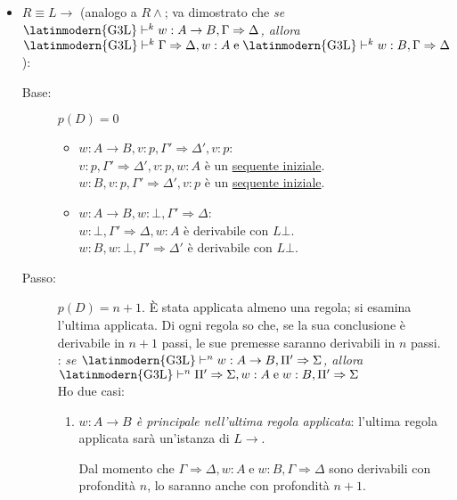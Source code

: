 \documentclass[a4paper,12pt]{article}
\newcommand{\latinmath}[1]{\text{\latinmodern{#1}}} %
\newcommand{\To}{\Rightarrow} %
\begin{document}
\begin{dimo}
\begin{itemize}
\begin{description}
\begin{enumerate}
			\end{enumerate}
		\end{description}
		\item $R \equiv L\to$ (analogo a $R\land$; va dimostrato che \emph{se $\latinmath{G3L} \vdash^{k} w:A \to B, \Gamma \To \Delta$, allora $\latinmath{G3L} \vdash^{k} \Gamma \To \Delta, w:A \; \text{e} \; \latinmath{G3L} \vdash^{k} w:B, \Gamma \To \Delta$}):
		\begin{description}
			\item[Base:] $p(D)=0$ 
			\begin{itemize}
				\item $w:A \to B, v:p, \Gamma' \To \Delta', v:p$: \\
				$v:p, \Gamma' \To \Delta', v:p, w:A$ \qquad \qquad è un \hyperlink{seqetin}{sequente iniziale}. \\
				$w:B, v:p, \Gamma' \To \Delta', v:p$ \qquad \qquad è un \hyperlink{seqetin}{sequente iniziale}.
				\item $w:A \to B, w:\bot, \Gamma' \To \Delta$: \\
				$w:\bot, \Gamma' \To \Delta, w:A$ \qquad \qquad \qquad è derivabile con \hyperlink{Lbotet}{$L\bot$}. \\
				$w:B, w:\bot, \Gamma' \To \Delta'$ \qquad \qquad \qquad è derivabile con \hyperlink{Lbotet}{$L\bot$}. 
			\end{itemize}
			\item[Passo:] $p(D)=n+1$. \`{E} stata applicata almeno una regola; si esamina l'ultima applicata. Di ogni regola so che, se la sua conclusione è derivabile in $n+1$ passi, le sue premesse saranno derivabili in $n$ passi. \\
			\latinmath{IH}: \emph{se $\latinmath{G3L} \vdash^{n} w:A \to B, \Pi' \To \Sigma$, allora $\latinmath{G3L} \vdash^{n} \Pi' \To \Sigma, w:A \; \text{e} \; w:B, \Pi' \To \Sigma$} \\
			Ho due casi:
			\begin{enumerate}
				\item \emph{$w:A \to B$ è principale nell'ultima regola applicata}: l'ultima regola applicata sarà un'istanza di $L\to$.
				\begin{mathpar}
					\inferrule*[Right=$L\to$]{\vdash^{n} \; \Pi_1 \To \Sigma_1\Gamma \To \Delta, w:A \\ \vdash^{n} \; w:B, \Gamma \To \Delta}{\vdash^{n+1} \quad w:A \to B, \Gamma \To \Delta}
				\end{mathpar}
				Dal momento che $\Gamma \To \Delta, w:A \; \text{e} \; w:B, \Gamma \To \Delta$ sono derivabili con profondità $n$, lo saranno anche con profondità $n+1$.

\end{enumerate}
\end{description}
\end{itemize}
\end{dimo}
\end{document}
